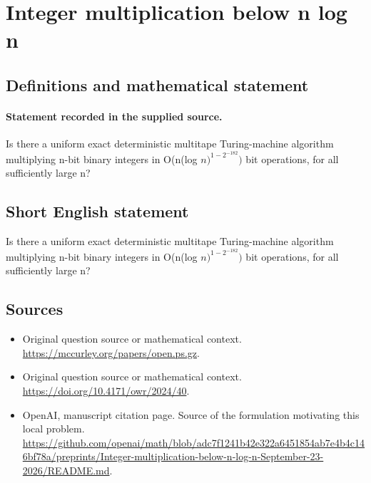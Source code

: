 \documentclass[11pt]{article}
\begin{document}
\section*{Integer multiplication below n log n}\label{statement}
\subsection{Definitions and mathematical statement}
\paragraph{Statement recorded in the supplied source.}
Is there a uniform exact deterministic multitape Turing-machine algorithm multiplying n-bit binary integers in O(n(log $n)^{1-2^{-182}})$ bit operations, for all sufficiently large n?
\subsection{Short English statement}
Is there a uniform exact deterministic multitape Turing-machine algorithm multiplying n-bit binary integers in O(n(log $n)^{1-2^{-182}})$ bit operations, for all sufficiently large n?
\subsection{Sources}
\begin{itemize}
\item[S1] Original question source or mathematical context.
\url{https://mccurley.org/papers/open.ps.gz}.
\item[S2] Original question source or mathematical context.
\url{https://doi.org/10.4171/owr/2024/40}.
\item[S3] OpenAI, manuscript citation page. Source of the formulation motivating this local problem.
\url{https://github.com/openai/math/blob/adc7f1241b42e322a6451854ab7e4b4c146bf78a/preprints/Integer-multiplication-below-n-log-n-September-23-2026/README.md}.
\end{itemize}
\end{document}
